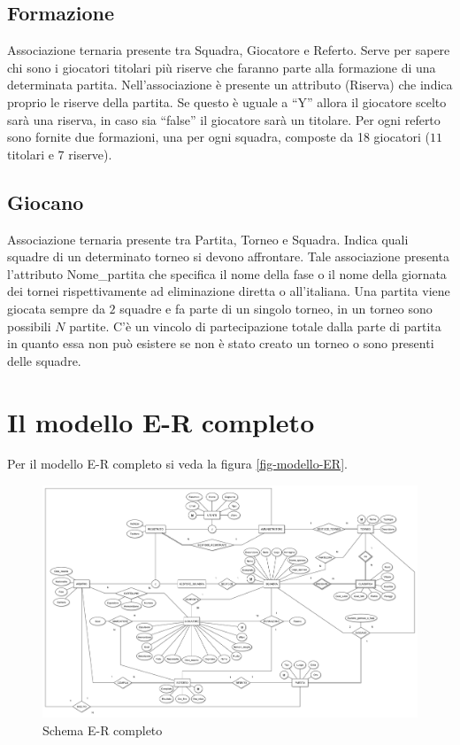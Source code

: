 	\subsection{Formazione}
	Associazione ternaria presente tra Squadra, Giocatore e Referto.
	Serve per sapere chi sono i giocatori titolari più riserve che faranno parte alla formazione di una determinata partita.
	Nell'associazione è presente un attributo (Riserva) che indica proprio le riserve della partita.
	Se questo è uguale a ``Y'' allora il giocatore scelto sarà una riserva, in caso sia ``false'' il giocatore sarà un titolare.
	Per ogni referto sono fornite due formazioni, una per ogni squadra, composte da 18 giocatori ($11$ titolari e $7$ riserve).
	
	\subsection{Giocano}
	Associazione ternaria presente tra Partita, Torneo e Squadra.
	Indica quali squadre di un determinato torneo si devono affrontare. Tale associazione presenta l’attributo Nome\_partita che specifica il nome della fase o il nome della giornata dei tornei rispettivamente ad eliminazione diretta o all'italiana. Una partita viene giocata sempre da $2$ squadre e fa parte di un singolo torneo, in un torneo sono possibili $N$ partite. C’è un vincolo di partecipazione totale dalla parte di partita in quanto essa non può esistere se non è stato creato un torneo o sono presenti delle squadre.
	

\section{Il modello E-R completo}
Per il modello E-R completo si veda la figura \vref{fig-modello-ER}.


\begin{figure}[h]
	\centering
	\includegraphics[height=0.83\textwidth,
	angle=90]
	{immagini/diagramma-ER-completo}
	
	\caption{Schema E-R completo}
	
	\label{fig-modello-ER}
\end{figure}	